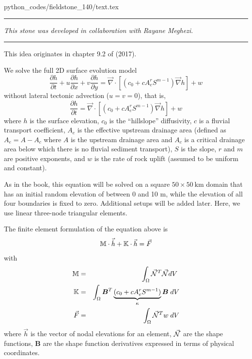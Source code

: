\begin{flushright} {\tiny {\color{gray} python\_codes/fieldstone\_140/text.tex}} \end{flushright}



\par\noindent\rule{\textwidth}{0.4pt}

{\sl This stone was developed in collaboration with Rayane Meghezi}. 

\par\noindent\rule{\textwidth}{0.4pt}

This \stone idea originates in chapter 9.2 of \textcite{simp17} (2017). 

We solve the full 2D surface evolution model 
\begin{equation}
\frac{\partial h}{\partial t}
+ u \frac{\partial h}{\partial x}
+ v \frac{\partial h}{\partial y}
= \vec\nabla\cdot \left[ (c_0 + c A_e^r S^{m-1}) \vec\nabla h \right] + w
\end{equation}
without lateral tectonic advection ($u=v=0$), that is,
\begin{equation}
\frac{\partial h}{\partial t}
= \vec\nabla\cdot \left[ (c_0 + c A_e^r S^{m-1}) \vec\nabla h \right] + w
\end{equation}
where $h$ is the surface elevation, 
$c_0$ is the ``hillslope'' diffusivity, 
$c$ is a fluvial transport coefficient, $A_e$ 
is the effective upstream drainage area (defined as $A_e = A - A_c$ 
where $A$ is the upstream drainage
area and $A_c$ is a critical drainage area below which there is no fluvial sediment transport),
$S$ is the slope, 
$r$ and $m$ are positive exponents, and $w$ is the rate of rock uplift (assumed to be uniform and constant).

As in the book, this equation will be solved on a square $50\times 50~\si{\km}$ 
domain that has an initial random elevation of
between 0 and 10 m, while the elevation of all four boundaries is fixed to zero. 
Additional setups will be added later. Here, we use linear three-node triangular elements.

The finite element formulation of the equation above is 
\[
{\mathbb{M}} \cdot \vec{\dot h} + {\mathbb{K}} \cdot \vec{h} = \vec{F} 
\]
with 
\begin{eqnarray}
{\mathbb{M}} &=& \int_\Omega \vec{{\mathcal{N}}}^T \vec{{\mathcal{N}}} dV \; \nonumber\\
{\mathbb{K}} &=& \int_\Omega {\bm B}^T \underbrace{(c_0 + c A_e^r S^{m-1})}_{\kappa}  {\bm B} \;  dV \nonumber\\
\vec{F} &=& \int_\Omega  \vec{{\mathcal{N}}}^T w \; dV
\end{eqnarray}
where $\vec{h}$ is the vector of nodal elevations for an element, $\vec{{\mathcal{N}}}$ 
are the shape functions, ${\bm B}$ are the shape function derivatives expressed 
in terms of physical coordinates.

